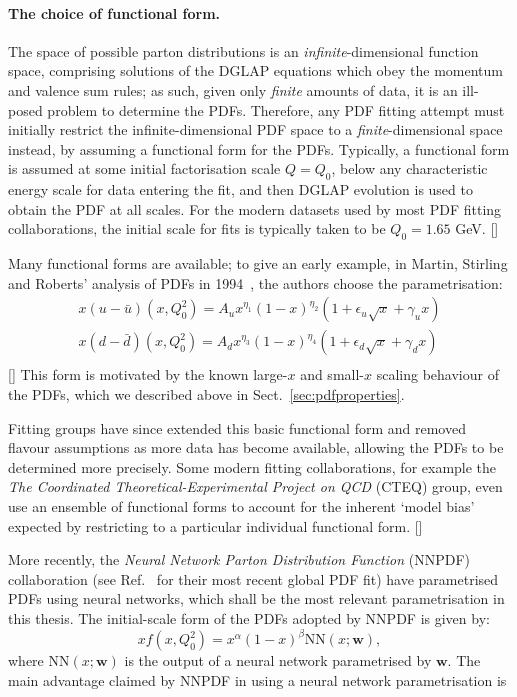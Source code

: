 \documentclass[withindex,glossary]{cam-thesis}
\renewcommand{\vec}[1]{\textbf{#1}} %
\begin{document}
\paragraph{The choice of functional form.} The space of possible parton distributions is an \textit{infinite}-dimensional function space, comprising solutions of the DGLAP equations which obey the momentum and valence sum rules; as such, given only \textit{finite} amounts of data, it is an ill-posed problem to determine the PDFs. Therefore, any PDF fitting attempt must initially restrict the infinite-dimensional PDF space to a \textit{finite}-dimensional space instead, by assuming a functional form for the PDFs. Typically, a functional form is assumed at some initial factorisation scale $Q = Q_0$, below any characteristic energy scale for data entering the fit, and then DGLAP evolution is used to obtain the PDF at all scales. For the modern datasets used by most PDF fitting collaborations, the initial scale for fits is typically taken to be $Q_0 = 1.65$ GeV. []

Many functional forms are available; to give an early example, in Martin, Stirling and Roberts' analysis of PDFs in 1994~\cite{Martin:1994kn}, the authors choose the parametrisation:
\begin{align}
x(u - \bar{u})(x,Q_0^2) = A_u x^{\eta_1} (1-x)^{\eta_2} (1 + \epsilon_u \sqrt{x} + \gamma_u x)\\
x(d - \bar{d})(x,Q_0^2) = A_d x^{\eta_3} (1-x)^{\eta_4} (1 + \epsilon_d \sqrt{x} + \gamma_d x)\\
\end{align}
[] This form is motivated by the known large-$x$ and small-$x$ scaling behaviour of the PDFs, which we described above in Sect.~\ref{sec:pdfproperties}. 

Fitting groups have since extended this basic functional form and removed flavour assumptions as more data has become available, allowing the PDFs to be determined more precisely. Some modern fitting collaborations, for example the \textit{The Coordinated Theoretical-Experimental Project on QCD} (CTEQ) group, even use an ensemble of functional forms to account for the inherent `model bias' expected by restricting to a particular individual functional form. []

More recently, the \textit{Neural Network Parton Distribution Function} (NNPDF) collaboration (see Ref.~\cite{NNPDF:2021njg} for their most recent global PDF fit) have parametrised PDFs using neural networks, which shall be the most relevant parametrisation in this thesis. The initial-scale form of the PDFs adopted by NNPDF is given by:
\begin{equation}
xf(x,Q_0^2) = x^{\alpha}(1-x)^{\beta} \text{NN}(x; \vec{w}),
\end{equation}
where $\text{NN}(x; \vec{w})$ is the output of a neural network parametrised by $\vec{w}$. The main advantage claimed by NNPDF in using a neural network parametrisation is   
\end{document}

